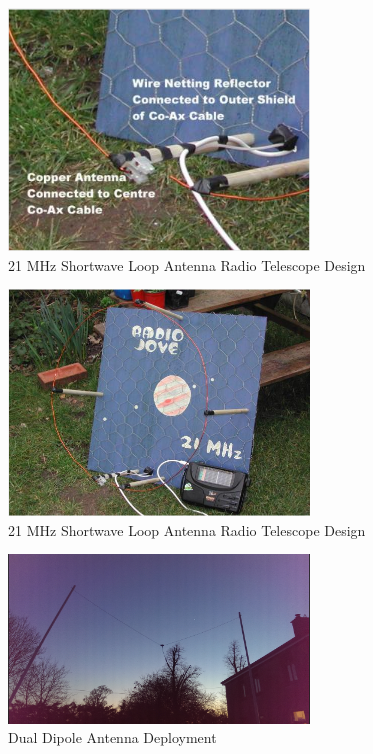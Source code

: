 \documentclass[runningheads,a4paper]{llncs}
\begin{document}
%
\begin{figure}[here]
\centering
\includegraphics[width=8cm]{images/16}
\caption{21 MHz Shortwave Loop Antenna Radio Telescope Design \citep{greef-12}}
\label{fig:loop_antenna_design_b}
\end{figure}
%

%
\begin{figure}[here]
\centering
\includegraphics[width=8cm]{images/15}
\caption{21 MHz Shortwave Loop Antenna Radio Telescope Design \citep{greef-12}}
\label{fig:loop_antenna_design_c}
\end{figure}
%

%
\begin{figure}[here]
\centering
\includegraphics[width=8cm]{images/32}
\caption{Dual Dipole Antenna Deployment}
\label{fig:dual_dipole_deployed}
\end{figure}
%
\end{document}
